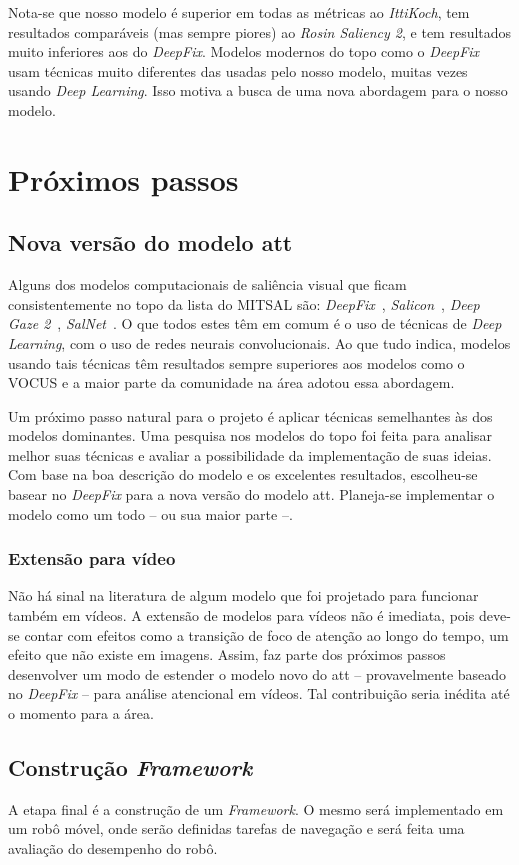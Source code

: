 \documentclass[article]{IEEEtran}
\newcommand{\tit}[1]{\textit{#1}}
\begin{document}
Nota-se que nosso modelo é superior em todas as métricas ao \tit{IttiKoch},
tem resultados comparáveis (mas sempre piores) ao \tit{Rosin Saliency 2},
e tem resultados muito inferiores aos do \tit{DeepFix}.
Modelos modernos do topo como o \tit{DeepFix} usam técnicas muito diferentes
das usadas pelo nosso modelo, muitas vezes usando \tit{Deep Learning}.
Isso motiva a busca de uma nova abordagem para o nosso modelo.

\section{Próximos passos}
\subsection{Nova versão do modelo att}
Alguns dos modelos computacionais de saliência visual que ficam consistentemente
no topo da lista do MITSAL são: \tit{DeepFix}~\cite{DeepFix},
\tit{Salicon}~\cite{Salicon}, \tit{Deep Gaze 2}~\cite{DeepGaze2},
\tit{SalNet}~\cite{SalNet}.
O que todos estes têm em comum é o uso de técnicas de \tit{Deep Learning},
com o uso de redes neurais convolucionais.
Ao que tudo indica, modelos usando tais técnicas têm resultados
sempre superiores aos modelos como o VOCUS e a maior parte da comunidade
na área adotou essa abordagem.

Um próximo passo natural para o projeto é aplicar técnicas semelhantes às dos
modelos dominantes.
Uma pesquisa nos modelos do topo foi feita para analisar melhor suas técnicas
e avaliar a possibilidade da implementação de suas ideias.
Com base na boa descrição do modelo e os excelentes resultados, escolheu-se
basear no \tit{DeepFix} para a nova versão do modelo att.
Planeja-se implementar o modelo como um todo -- ou sua maior parte --.

\subsubsection{Extensão para vídeo}
Não há sinal na literatura de algum modelo que foi projetado para funcionar
também em vídeos. A extensão de modelos para vídeos não é imediata, pois
deve-se contar com efeitos como a transição de foco de atenção ao longo do
tempo, um efeito que não existe em imagens.
Assim, faz parte dos próximos passos desenvolver um modo de estender o modelo
novo do att -- provavelmente baseado no \tit{DeepFix} -- para análise
atencional em vídeos.
Tal contribuição seria inédita até o momento para a área.

\subsection{Construção \tit{Framework}}
A etapa final é a construção de um \tit{Framework}.
O mesmo será implementado em um robô móvel, onde serão definidas tarefas
de navegação e será feita uma avaliação do desempenho do robô.

\printbibliography

\end{document}
